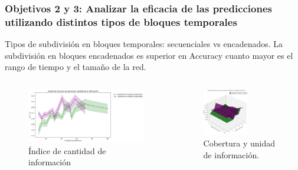 \documentclass{beamer}
\begin{document}
\begin{frame}
	\frametitle{Objetivos 2 y 3: Analizar la eficacia de las predicciones utilizando distintos tipos de bloques temporales}
\begin{block}{Tipos de subdivisión en bloques temporales: secuenciales vs encadenados.}
La subdivisión en bloques encadenados es superior en Accuracy cuanto mayor es el rango de tiempo y el tamaño de la red.
	\end{block}
	

	\begin{columns}[c]
	\begin{column}{.5\textwidth}
		\begin{figure}
			\centering
			\includegraphics[width=1\textwidth]{figs/cap7/figura_17}
\caption{Índice de cantidad de información}
		\end{figure}      
	\end{column}
	\begin{column}{.5\textwidth}
		\begin{figure}
			\centering
			\includegraphics[width=0.6\textwidth]{figs/cap7/figura_18}
			\caption{Cobertura y unidad de información.}
		\end{figure}
	\end{column}
\end{columns}
	
\end{frame}
\end{document}
